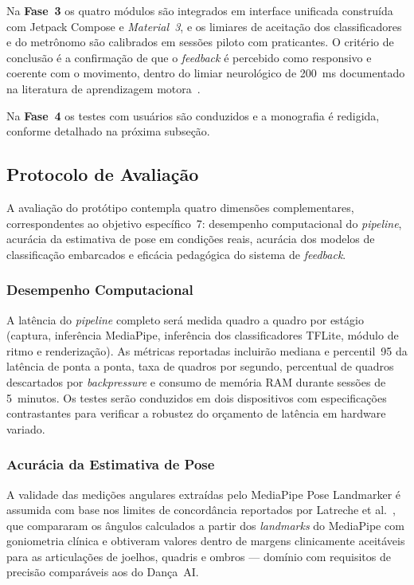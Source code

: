 Na \textbf{Fase~3} os quatro módulos são integrados em interface unificada construída com
Jetpack Compose e \textit{Material~3}, e os limiares de aceitação dos classificadores e do
metrônomo são calibrados em sessões piloto com praticantes. O critério de conclusão é a
confirmação de que o \textit{feedback} é percebido como responsivo e coerente com o
movimento, dentro do limiar neurológico de 200~ms documentado na literatura de aprendizagem
motora~\cite{plos_feedback_delay}.

Na \textbf{Fase~4} os testes com usuários são conduzidos e a monografia é redigida,
conforme detalhado na próxima subseção.

\subsection{Protocolo de Avaliação}
\label{sub:avaliacao}

A avaliação do protótipo contempla quatro dimensões complementares, correspondentes ao
objetivo específico~7: desempenho computacional do \textit{pipeline}, acurácia da estimativa
de pose em condições reais, acurácia dos modelos de classificação embarcados e eficácia
pedagógica do sistema de \textit{feedback}.

\subsubsection{Desempenho Computacional}
A latência do \textit{pipeline} completo será medida quadro a quadro por estágio
(captura, inferência MediaPipe, inferência dos classificadores TFLite, módulo de ritmo e
renderização). As métricas
reportadas incluirão mediana e percentil~95 da latência de ponta a ponta, taxa de quadros por
segundo, percentual de quadros descartados por \textit{backpressure} e consumo de memória RAM
durante sessões de 5~minutos. Os testes serão conduzidos em dois dispositivos com
especificações contrastantes para verificar a robustez do orçamento de latência em hardware
variado.

\subsubsection{Acurácia da Estimativa de Pose}
A validade das medições angulares extraídas pelo MediaPipe Pose Landmarker é assumida
com base nos limites de concordância reportados por Latreche et
al.~\cite{LATRECHE2023112826}, que compararam os ângulos calculados a partir dos
\textit{landmarks} do MediaPipe com goniometria clínica e obtiveram valores dentro de
margens clinicamente aceitáveis para as articulações de joelhos, quadris e ombros ---
domínio com requisitos de precisão comparáveis aos do Dança~AI.


